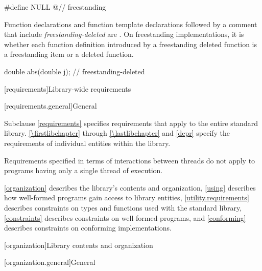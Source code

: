 \pnum
\begin{example}
\begin{codeblock}
#define NULL @\seebelow@      // freestanding
\end{codeblock}
\end{example}

\begin{example}
\begin{codeblock}
// all freestanding
namespace std {
\end{codeblock}
\end{example}

\pnum
Function declarations and function template declarations
followed by a comment that include \textit{freestanding-deleted} are
.
On freestanding implementations,
it is 
whether each function definition introduced by a freestanding deleted function
is a freestanding item or a deleted function.
\begin{example}
\begin{codeblock}
double abs(double j);           // freestanding-deleted
\end{codeblock}
\end{example}

[requirements]{Library-wide requirements}

[requirements.general]{General}

\pnum
Subclause \ref{requirements} specifies requirements that apply to the entire \Cpp{} standard library.
\ref{\firstlibchapter} through \ref{\lastlibchapter} and \ref{depr}
specify the requirements of individual entities within the library.

\pnum
Requirements specified in terms of interactions between threads do not apply to
programs having only a single thread of execution.

\pnum
\ref{organization} describes the library's contents and
organization, \ref{using} describes how well-formed \Cpp{} programs gain access to library
entities,
\ref{utility.requirements} describes constraints on types and functions used with
the \Cpp{} standard library,
\ref{constraints} describes constraints on well-formed \Cpp{} programs, and
\ref{conforming} describes constraints on conforming implementations.

[organization]{Library contents and organization}

[organization.general]{General}

